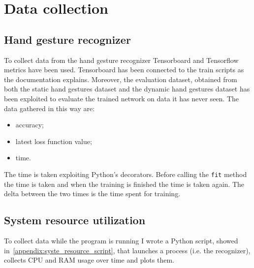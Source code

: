 \documentclass[../thesis.tex]{subfiles}
\begin{document}
\section{Data collection}
\subsection{Hand gesture recognizer}
To collect data from the hand gesture recognizer Tensorboard and Tensorflow metrics have been used. Tensorboard has been connected to the train scripts as the documentation explains. Moreover, the evaluation dataset, obtained from both the static hand gestures dataset and the dynamic hand gestures dataset has been exploited to evaluate the trained network on data it has never seen. The data gathered in this way are:
\begin{itemize}
    \item accuracy;
    \item latest loss function value;
    \item time.
\end{itemize}
The time is taken exploiting Python's decorators. Before calling the \texttt{fit} method the time is taken and when the training is finished the time is taken again. The delta between the two times is the time spent for training.

\subsection{System resource utilization}\label{ss:system_resource_utilization}
To collect data while the program is running I wrote a Python script, showed in~\ref{appendix:syste_resource_script}, that launches a process (i.e. the recognizer), collects CPU and RAM usage over time and plots them.
\end{document}
